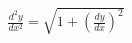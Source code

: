 \documentclass[preview]{standalone}
\begin{document}
\begin{align*}
\frac{d^2y}{dx^2}=\sqrt{1+\left(\frac{dy}{dx}\right)^2}
\end{align*}
\end{document}
